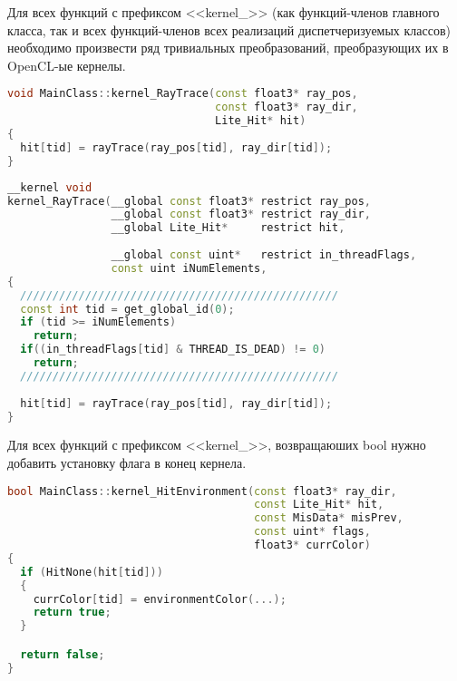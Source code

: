 \documentclass[a4paper,12pt]{article}
\begin{document}
Для всех функций с префиксом <<kernel\_>> (как функций-членов главного класса, так и всех функций-членов всех реализаций диспетчеризуемых классов) необходимо произвести ряд тривиальных преобразований, преобразующих их в OpenCL-ые кернелы.

\begin{lstlisting}[language=C++, caption=Пример входа для void функции, captionpos=b, label=inputexample]
void MainClass::kernel_RayTrace(const float3* ray_pos, 
                                const float3* ray_dir, 
                                Lite_Hit* hit)
{
  hit[tid] = rayTrace(ray_pos[tid], ray_dir[tid]); 
}
\end{lstlisting}


\begin{lstlisting}[language=C++, caption=Пример входа для void функции, captionpos=b, label=outputexample]
__kernel void 
kernel_RayTrace(__global const float3* restrict ray_pos, 
                __global const float3* restrict ray_dir,
                __global Lite_Hit*     restrict hit,
                
                __global const uint*   restrict in_threadFlags,
                const uint iNumElements,
{
  /////////////////////////////////////////////////
  const int tid = get_global_id(0);
  if (tid >= iNumElements)
    return;
  if((in_threadFlags[tid] & THREAD_IS_DEAD) != 0)
    return;
  /////////////////////////////////////////////////
  
  hit[tid] = rayTrace(ray_pos[tid], ray_dir[tid]); 
}
\end{lstlisting}

\newpage

Для всех функций с префиксом <<kernel\_>>, возвращаюших bool нужно добавить установку флага в конец кернела.


\begin{lstlisting}[language=C++, caption=Пример входа для bool функции, captionpos=b, label=inputexample2]
bool MainClass::kernel_HitEnvironment(const float3* ray_dir, 
                                      const Lite_Hit* hit, 
                                      const MisData* misPrev, 
                                      const uint* flags,
                                      float3* currColor)
{
  if (HitNone(hit[tid]))
  {
    currColor[tid] = environmentColor(...);
    return true;
  }

  return false;
}
\end{lstlisting}
\end{document}
